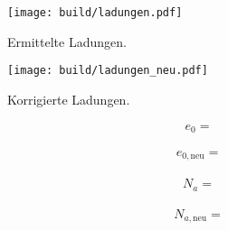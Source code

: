 \begin{figure}
  \centering
  \texttt{[image: build/ladungen.pdf]}
  \caption{Ermittelte Ladungen.}
  \label{plot:1}
\end{figure}

\begin{figure}
  \centering
  \texttt{[image: build/ladungen\_neu.pdf]}
  \caption{Korrigierte Ladungen.}
  \label{plot:2}
\end{figure}

\begin{align*}
  e_0 = 
\end{align*}

\begin{align*}
  e_{0,\text{neu}} = 
\end{align*}

\begin{align*}
  N_{a} = 
\end{align*}

\begin{align*}
  N_{a,\text{neu}} = 
\end{align*}




